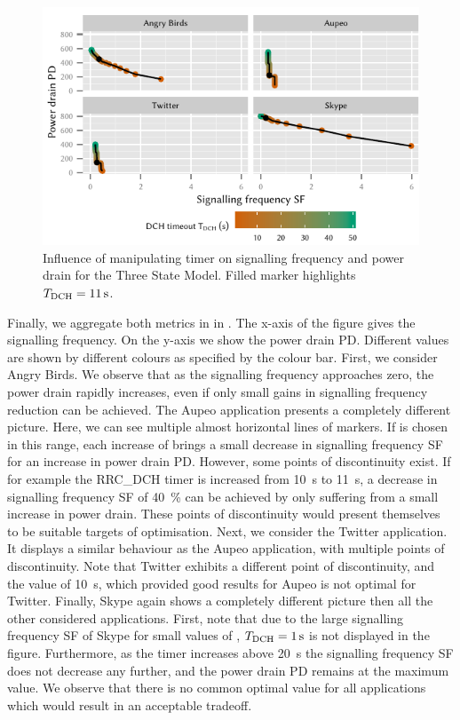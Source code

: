 \begin{figure}
	\centering
	\includegraphics{network/network_traces/numerical_results/figures/3_state_signalling_vs_power_consumption}
	\caption{Influence of manipulating \TDCH timer on signalling frequency  and power drain  for the Three State Model. Filled marker highlights \(T_{\text{DCH}} = \SI{11}{\second}\).}\label{fig:network:network_traces:numerical_results:three_states:trade_off}
\end{figure}
Finally, we aggregate both metrics in in .
The x-axis of the figure gives the signalling frequency.
On the y-axis we show the power drain \gls{PD}.
Different \TDCH values are shown by different colours as specified by the colour bar.
First, we consider Angry Birds.
We observe that as the signalling frequency approaches zero, the power drain rapidly increases, even if only small gains in signalling frequency reduction can be achieved.
The Aupeo application presents a completely different picture.
Here, we can see multiple almost horizontal lines of markers.
If \TDCH is chosen in this range, each increase of \TDCH brings a small decrease in signalling frequency \gls{SF} for an increase in power drain \gls{PD}.
However, some points of discontinuity exist.
If for example the \gls{RRC_DCH} timer is increased from \SI{10}{\second} to \SI{11}{\second}, a decrease in signalling frequency \gls{SF} of \SI{40}{\percent} can be achieved by only suffering from a small increase in power drain.
These points of discontinuity would present themselves to be suitable targets of optimisation.
Next, we consider the Twitter application.
It displays a similar behaviour as the Aupeo application, with multiple points of discontinuity.
Note that Twitter exhibits a different point of discontinuity, and the \TDCH value of \SI{10}{\second}, which provided good results for Aupeo is not optimal for Twitter.
Finally, Skype again shows a completely different picture then all the other considered applications.
First, note that due to the large signalling frequency \gls{SF} of Skype for small values of \TDCH, \(T_{\text{DCH}} = \SI{1}{\second}\) is not displayed in the figure.
Furthermore, as the \TDCH timer increases above \SI{20}{\second} the signalling frequency \gls{SF} does not decrease any further, and the power drain \gls{PD} remains at the maximum value.
We observe that there is no common optimal value for all applications which would result in an acceptable tradeoff.


